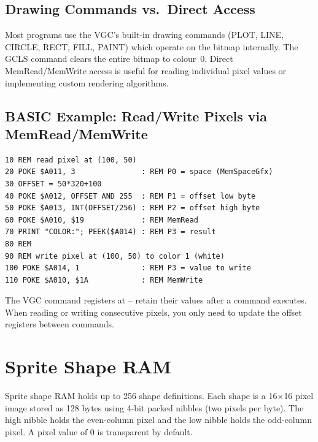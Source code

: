 \subsection{Drawing Commands vs.\ Direct Access}

Most programs use the VGC's built-in drawing commands (PLOT, LINE, CIRCLE, RECT,
FILL, PAINT) which operate on the bitmap internally.  The GCLS command clears
the entire bitmap to colour~0.  Direct MemRead/MemWrite access is useful for
reading individual pixel values or implementing custom rendering algorithms.

\subsection{BASIC Example: Read/Write Pixels via MemRead/MemWrite}

\begin{lstlisting}
10 REM read pixel at (100, 50)
20 POKE $A011, 3               : REM P0 = space (MemSpaceGfx)
30 OFFSET = 50*320+100
40 POKE $A012, OFFSET AND 255  : REM P1 = offset low byte
50 POKE $A013, INT(OFFSET/256) : REM P2 = offset high byte
60 POKE $A010, $19             : REM MemRead
70 PRINT "COLOR:"; PEEK($A014) : REM P3 = result
80 REM
90 REM write pixel at (100, 50) to color 1 (white)
100 POKE $A014, 1              : REM P3 = value to write
110 POKE $A010, $1A            : REM MemWrite
\end{lstlisting}

\begin{notebox}
The VGC command registers at -- retain their values after
a command executes.  When reading or writing consecutive pixels, you only need to
update the offset registers between commands.
\end{notebox}


\section{Sprite Shape RAM}
\label{sec:sprite-shapes}

Sprite shape RAM holds up to 256 shape definitions.  Each shape is a
16$\times$16 pixel image stored as 128 bytes using 4-bit packed nibbles (two
pixels per byte).  The high nibble holds the even-column pixel and the low
nibble holds the odd-column pixel.  A pixel value of 0 is transparent by
default.

